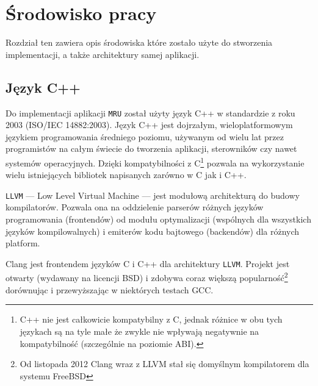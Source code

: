 \chapter{Środowisko pracy}
\label{srodowisko}
\par
Rozdział ten zawiera opis środowiska które zostało użyte do stworzenia implementacji, a także architektury samej aplikacji.

\section{Język C++}
\par
Do implementacji aplikacji \texttt{MRU} został użyty język C++ w standardzie z roku 2003 (ISO/IEC 14882:2003).
Język C++ jest dojrzałym, wieloplatformowym językiem programowania średniego poziomu, używanym od wielu lat przez programistów na całym świecie do tworzenia aplikacji, sterowników czy nawet systemów operacyjnych. Dzięki kompatybilności z C\footnote{C++ nie jest całkowicie kompatybilny z  C, jednak różnice w obu tych językach są na tyle małe że zwykle nie wpływają negatywnie na kompatybilność (szczególnie na poziomie ABI).} pozwala na wykorzystanie wielu istniejących bibliotek napisanych zarówno w C jak i C++.

\par
\texttt{LLVM} --- Low Level Virtual Machine --- jest modułową architekturą do budowy kompilatorów. Pozwala ona na oddzielenie parserów różnych języków programowania (frontendów) od modułu optymalizacji (wspólnych dla wszystkich języków kompilowalnych) i emiterów kodu bajtowego (backendów) dla różnych platform.

\par
Clang jest frontendem języków C i C++ dla architektury \texttt{LLVM}. Projekt jest otwarty (wydawany na licencji BSD) i zdobywa coraz większą popularność\footnote{Od listopada 2012 Clang wraz z LLVM stał się domyślnym kompilatorem dla systemu FreeBSD} dorównując i przewyższając w niektórych testach GCC.

